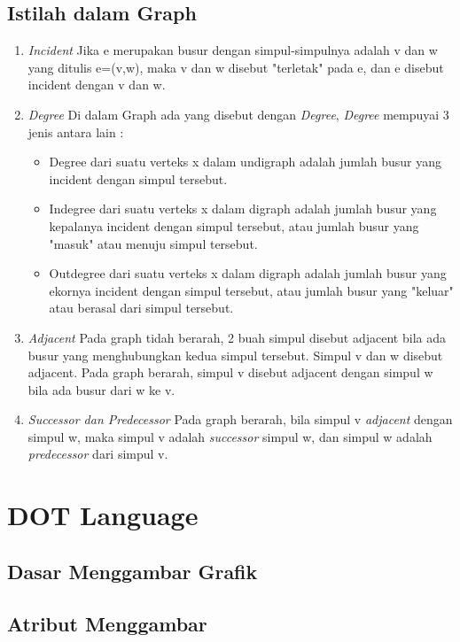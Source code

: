 \subsection{Istilah dalam Graph}
\label{sec: Istilah dalam Graph}
\begin{enumerate}
\item \textit{Incident}
Jika e merupakan busur dengan simpul-simpulnya adalah v dan w yang
ditulis e=(v,w), maka v dan w disebut "terletak" pada e, dan e disebut incident
dengan v dan w.
\item \textit{Degree}
Di dalam Graph ada yang disebut dengan \textit{Degree}, \textit{Degree} mempuyai 3 jenis antara lain :
\begin{itemize}
\item Degree dari suatu verteks x dalam undigraph adalah jumlah busur yang
incident dengan simpul tersebut.
\item Indegree dari suatu verteks x dalam digraph adalah jumlah busur yang
kepalanya incident dengan simpul tersebut, atau jumlah busur yang "masuk" atau menuju simpul tersebut.
\item Outdegree dari suatu verteks x dalam digraph adalah jumlah busur yang
ekornya incident dengan simpul tersebut, atau jumlah busur yang "keluar"
atau berasal dari simpul tersebut.
\end{itemize}
\item \textit{Adjacent}
Pada graph tidah berarah, 2 buah simpul disebut adjacent bila ada busur yang
menghubungkan kedua simpul tersebut. Simpul v dan w disebut adjacent. 
Pada graph berarah, simpul v disebut adjacent dengan simpul w bila ada busur
dari w ke v.
\item \textit{Successor dan Predecessor}
Pada graph berarah, bila simpul v \textit{adjacent} dengan simpul w, maka simpul v adalah \textit{successor} simpul w, dan simpul w adalah \textit{predecessor} dari simpul v.
\end{enumerate}

\section{DOT Language}
\label{secl : DOT Language}


\subsection{Dasar Menggambar Grafik}
\label{sec: Dasar Menggambar Grafik}


\subsection{Atribut Menggambar}
\label{sec: Atribut Menggambar}

